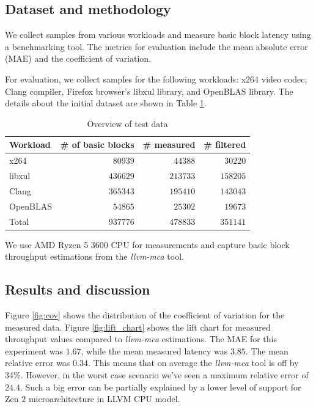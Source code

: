\subsection{Dataset and methodology}
We collect samples from various workloads and measure basic block latency using a benchmarking tool.
The metrics for evaluation include the mean absolute error (MAE) and the coefficient of variation.

For evaluation, we collect samples for the following workloads: x264 video codec, Clang compiler, 
Firefox browser's libxul library, and OpenBLAS library. The details about the initial dataset are 
shown in Table \ref{tab:test_data}.

\begin{table}[htbp]
  \caption{Overview of test data}
  \label{tab:test_data}
  \begin{tabular}{lrrr}
  \hline
  Workload & \# of basic blocks & \# measured & \# filtered \\
  \hline
  x264     & $80939$              & $44388$       & $30220$       \\
  libxul   & $436629$             & $213733$      & $158205$      \\
  Clang    & $365343$             & $195410$      & $143043$      \\
  OpenBLAS & $54865$              & $25302$       & $19673$       \\
  Total    & $937776$             & $478833$      & $351141$
  \end{tabular}
\end{table}

We use AMD Ryzen 5 3600 CPU for measurements and capture basic block throughput
estimations from the \textit{llvm-mca} tool.

\subsection{Results and discussion}
Figure \ref{fig:cov} shows the distribution of the coefficient of variation for
the measured data. Figure \ref{fig:lift_chart} shows the lift chart for measured
throughput values compared to \textit{llvm-mca} estimations. The MAE for this
experiment was $1.67$, while the mean measured latency was $3.85$. The mean relative
error was $0.34$. This means that on average the \textit{llvm-mca} tool is off by 34\%.
However, in the worst case scenario we've seen a maximum relative error of $24.4$.
Such a big error can be partially explained by a lower level of support for Zen 2
microarchitecture in LLVM CPU model.


